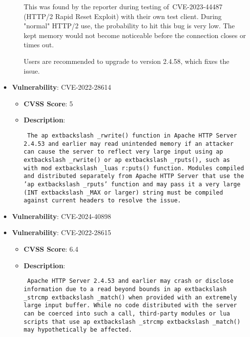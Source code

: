 \documentclass{article}
\begin{document}
\begin{itemize}
\begin{itemize}
{{This was found by the reporter during testing of CVE-2023-44487 (HTTP/2 Rapid Reset Exploit) with their own test client. During "normal" HTTP/2 use, the probability to hit this bug is very low. The kept memory would not become noticeable before the connection closes or times out.

Users are recommended to upgrade to version 2.4.58, which fixes the issue.
 }}
        \end{itemize}
    
        \item \textbf{Vulnerability}: CVE-2022-28614
        \begin{itemize}
            \item \textbf{CVSS Score}:  5 
            \item \textbf{Description}: \parbox{\linewidth}{\texttt{ The ap	extbackslash _rwrite() function in Apache HTTP Server 2.4.53 and earlier may read unintended memory if an attacker can cause the server to reflect very large input using ap	extbackslash _rwrite() or ap	extbackslash _rputs(), such as with mod	extbackslash _luas r:puts() function. Modules compiled and distributed separately from Apache HTTP Server that use the 'ap	extbackslash _rputs' function and may pass it a very large (INT	extbackslash _MAX or larger) string must be compiled against current headers to resolve the issue. }}
        \end{itemize}
    
        \item \textbf{Vulnerability}: CVE-2024-40898
    
        \item \textbf{Vulnerability}: CVE-2022-28615
        \begin{itemize}
            \item \textbf{CVSS Score}:  6.4 
            \item \textbf{Description}: \parbox{\linewidth}{\texttt{ Apache HTTP Server 2.4.53 and earlier may crash or disclose information due to a read beyond bounds in ap	extbackslash _strcmp	extbackslash _match() when provided with an extremely large input buffer. While no code distributed with the server can be coerced into such a call, third-party modules or lua scripts that use ap	extbackslash _strcmp	extbackslash _match() may hypothetically be affected. }}
        \end{itemize}
    

\end{itemize}
\end{document}
